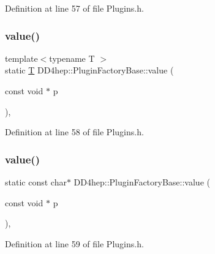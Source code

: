 Definition at line 57 of file Plugins.\+h.

\hypertarget{struct_d_d4hep_1_1_plugin_factory_base_a7fc28aeb61b438dd2e9adcc9a6fc09b5}{}\label{struct_d_d4hep_1_1_plugin_factory_base_a7fc28aeb61b438dd2e9adcc9a6fc09b5} 
\subsubsection{\texorpdfstring{value()}{value()}\hspace{0.1cm}{\footnotesize\ttfamily [1/4]}}
{\footnotesize\ttfamily template$<$typename T $>$ \\
static \hyperlink{class_t}{T} D\+D4hep\+::\+Plugin\+Factory\+Base\+::value (\begin{DoxyParamCaption}\item[{const void $\ast$}]{p }\end{DoxyParamCaption})\hspace{0.3cm}{\ttfamily [inline]}, {\ttfamily [static]}}



Definition at line 58 of file Plugins.\+h.

\hypertarget{struct_d_d4hep_1_1_plugin_factory_base_a8adc43989827d1bc0a6d079b3e64f756}{}\label{struct_d_d4hep_1_1_plugin_factory_base_a8adc43989827d1bc0a6d079b3e64f756} 
\subsubsection{\texorpdfstring{value()}{value()}\hspace{0.1cm}{\footnotesize\ttfamily [2/4]}}
{\footnotesize\ttfamily static const char$\ast$ D\+D4hep\+::\+Plugin\+Factory\+Base\+::value (\begin{DoxyParamCaption}\item[{const void $\ast$}]{p }\end{DoxyParamCaption})\hspace{0.3cm}{\ttfamily [inline]}, {\ttfamily [static]}}



Definition at line 59 of file Plugins.\+h.

\hypertarget{struct_d_d4hep_1_1_plugin_factory_base_aad606ff4edce954df9c7c63bc77492db}{}\label{struct_d_d4hep_1_1_plugin_factory_base_aad606ff4edce954df9c7c63bc77492db} 
